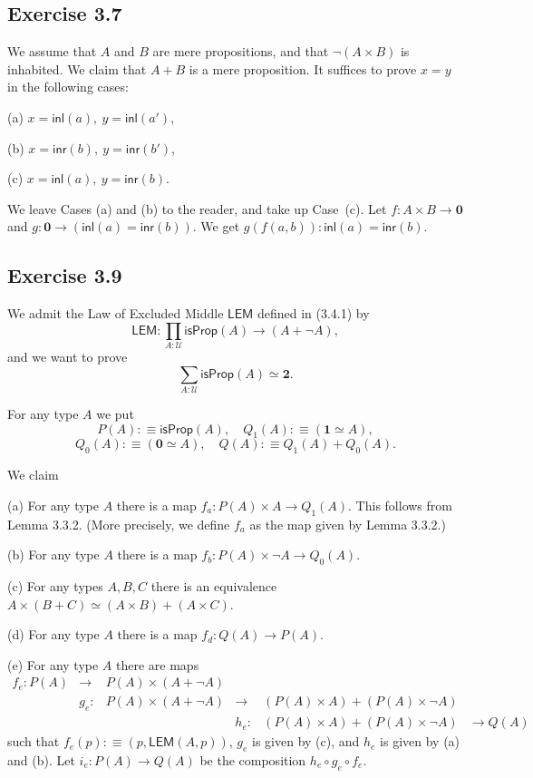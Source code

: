 \documentclass[12pt]{article}
\newcommand{\mbf}{\mathbf}
\newcommand{\msf}{\mathsf}
\newcommand{\nn}{\noindent}
\newcommand{\U}{\mathcal U}
\begin{document}

\subsection{Exercise 3.7}

We assume that $A$ and $B$ are mere propositions, and that $\neg(A\times B)$ is inhabited. We claim that $A+B$ is a mere proposition. It suffices to prove $x=y$ in the following cases:

(a) $x=\msf{inl}(a),\ y=\msf{inl}(a')$,

(b) $x=\msf{inr}(b),\ y=\msf{inr}(b')$,

(c) $x=\msf{inl}(a),\ y=\msf{inr}(b)$.

\nn We leave Cases (a) and (b) to the reader, and take up Case~(c). Let $f:A\times B\to\mbf0$ and $g:\mbf0\to(\msf{inl}(a)=\msf{inr}(b))$. We get $g(f(a,b)):\msf{inl}(a)=\msf{inr}(b)$.


\subsection{Exercise 3.9}

We admit the Law of Excluded Middle $\msf{LEM}$ defined in (3.4.1) by 
$$
\msf{LEM}:\prod_{A:\U}\msf{isProp}(A)\to(A+\neg A),
$$ 
and we want to prove 
\begin{equation}\label{e39}
\sum_{A:\U}\msf{isProp}(A)\simeq\mbf2.
\end{equation}

For any type $A$ we put 
$$
P(A):\equiv\msf{isProp}(A),\quad Q_1(A):\equiv(\mbf1\simeq A),
$$
$$
Q_0(A):\equiv(\mbf0\simeq A),\quad Q(A):\equiv Q_1(A)+Q_0(A).
$$ 

We claim

\nn(a) For any type $A$ there is a map $f_a:P(A)\times A\to Q_1(A)$. This follows from Lemma 3.3.2. (More precisely, we define $f_a$ as the map given by Lemma 3.3.2.)

\nn(b) For any type $A$ there is a map $f_b:P(A)\times\neg A\to Q_0(A)$.

\nn(c) For any types $A,B,C$ there is an equivalence $A\times(B+C)\simeq(A\times B)+(A\times C)$.

\nn(d) For any type $A$ there is a map $f_d:Q(A)\to P(A)$.

\nn(e) For any type $A$ there are maps 
$$
\begin{matrix}
f_e:P(A)&\to &P(A)\times(A+\neg A)\\ 
        &g_e:&P(A)\times(A+\neg A)&\to &(P(A)\times A)+(P(A)\times\neg A)\\ 
        &    &                    &h_e:&(P(A)\times A)+(P(A)\times\neg A)&\to Q(A)
\end{matrix}
$$ 
such that $f_e(p):\equiv(p,\msf{LEM}(A,p))$, $g_e$ is given by (c), and $h_e$ is given by (a) and (b). Let $i_e:P(A)\to Q(A)$ be the composition $h_e\circ g_e\circ f_e$.
\end{document}
